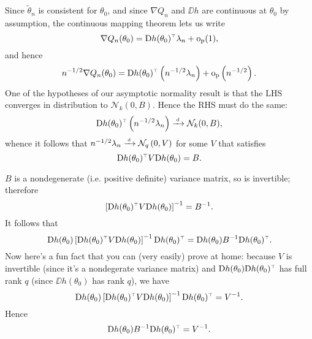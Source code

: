 \documentclass[11pt,letterpaper,reqno,oneside]{article}
\begin{document}
Since $\widetilde{\theta}_n$ is consistent for $\theta_0$, and since $\nabla Q_n$ and $\DD h$ are continuous at $\theta_0$ by assumption, the continuous mapping theorem lets us write
%
\begin{equation*}
	\nabla Q_n(\theta_0)
	= \mathrm{D} h(\theta_0)^{\scriptscriptstyle \top} \lambda_n
	+ \mathrm{o}_{\mathrm{p}}(1) ,
\end{equation*}
%
and hence
%
\begin{equation*}
	n^{-1/2} \nabla Q_n(\theta_0)
	= \mathrm{D} h(\theta_0)^{\scriptscriptstyle \top} \left( n^{-1/2} \lambda_n \right) 
	+ \mathrm{o}_{\mathrm{p}}\left( n^{-1/2} \right) .
\end{equation*}
%
One of the hypotheses of our asymptotic normality result is that the LHS converges in distribution to $\mathcal{N}_k(0,B)$. Hence the RHS must do the same:
%
\begin{equation*}
	\mathrm{D} h(\theta_0)^{\scriptscriptstyle \top} \left( n^{-1/2} \lambda_n \right) 
	\xrightarrow{{\scriptscriptstyle \mathrm{\;d\;}}} \mathcal{N}_k(0,B) ,
\end{equation*}
%
whence it follows that $n^{-1/2} \lambda_n \xrightarrow{{\scriptscriptstyle \mathrm{\;d\;}}} \mathcal{N}_q\left( 0, V \right)$ for some $V$ that satisfies
%
\begin{equation*}
	\mathrm{D} h(\theta_0)^{\scriptscriptstyle \top} V \mathrm{D} h(\theta_0) = B .
\end{equation*}


$B$ is a nondegenerate (i.e. positive definite) variance matrix, so is invertible; therefore
%
\begin{equation*}
	\left[ \mathrm{D} h(\theta_0)^{\scriptscriptstyle \top} V \mathrm{D} h(\theta_0) \right]^{-1} = B^{-1} .
\end{equation*}
%
It follows that
%
\begin{equation*}
	\mathrm{D} h(\theta_0)
	\left[ \mathrm{D} h(\theta_0)^{\scriptscriptstyle \top} V \mathrm{D} h(\theta_0) \right]^{-1}
	\mathrm{D} h(\theta_0)^{\scriptscriptstyle \top}
	= \mathrm{D} h(\theta_0) B^{-1} \mathrm{D} h(\theta_0)^{\scriptscriptstyle \top} .
\end{equation*}
%
Now here's a fun fact that you can (very easily) prove at home: because $V$ is invertible (since it's a nondegerate variance matrix) and $\mathrm{D} h(\theta_0) \mathrm{D} h(\theta_0)^{\scriptscriptstyle \top}$ has full rank $q$ (since $\DD h(\theta_0)$ has rank $q$), we have
%
\begin{equation}
	\mathrm{D} h(\theta_0)
	\left[ \mathrm{D} h(\theta_0)^{\scriptscriptstyle \top} V \mathrm{D} h(\theta_0) \right]^{-1}
	\mathrm{D} h(\theta_0)^{\scriptscriptstyle \top}
	= V^{-1} .
	\label{eq:convenient_fact_raw}
\end{equation}
%
Hence 
%
\begin{equation}
	\mathrm{D} h(\theta_0) B^{-1} \mathrm{D} h(\theta_0)^{\scriptscriptstyle \top} 
	= V^{-1} .
	\label{eq:convenient_fact}
\end{equation}
\end{document}
